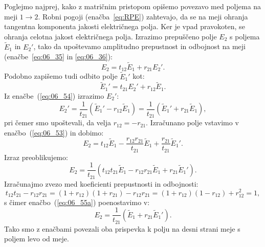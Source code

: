 Poglejmo najprej, kako z matričnim pristopom opišemo povezavo med poljema na 
meji $1\rightarrow 2$. Robni pogoji (enačba~\ref{eq:RPE}) zahtevajo, 
da se na meji ohranja tangentna komponenta jakosti električnega polja. Ker je
vpad pravokoten, se ohranja celotna jakost električnega polja. Izrazimo 
prepuščeno polje $E_2$ s poljema $\tilde{E}_1$ in $E_2'$, tako da upoštevamo
amplitudno prepustnost in odbojnost na meji (enačbe~\ref{eq:06_35} in \ref{eq:06_36}):
\begin{equation}
E_2 = t_{12}\tilde{E}_1 + r_{21}E_2'.
\label{eq:06_53}
\end{equation}
Podobno zapišemo tudi odbito polje $\tilde{E}_1'$ kot:
\begin{equation}
\tilde{E}_1' = t_{21}E_2' + r_{12}\tilde{E}_1.
\label{eq:06_54}
\end{equation}
Iz enačbe~(\ref{eq:06_54}) izrazimo $E_2'$:
\begin{equation}
E_2' = \frac{1}{t_{21}}\left(\tilde{E}_1' - r_{12}\tilde{E}_1\right) = 
\frac{1}{t_{21}}\left(\tilde{E}_1' + r_{21}\tilde{E}_1\right),
\label{eq:06_54a}
\end{equation}
pri čemer smo upoštevali, da velja $r_{12} = - r_{21}$. Izračunano polje vstavimo v 
enačbo~(\ref{eq:06_53}) in dobimo:
\begin{equation}
E_2 = t_{12}\tilde{E}_1 -\frac{r_{12}r_{21}}{t_{21}}\tilde{E}_1 + 
\frac{r_{21}}{t_{21}}\tilde{E}_1'.
\label{eq:06_55}
\end{equation}
Izraz preoblikujemo:
\begin{equation}
E_2 = \frac{1}{t_{21}} \left(t_{12}t_{21}\tilde{E}_1 -r_{12}r_{21}\tilde{E}_1 + 
r_{21}\tilde{E}_1'\right)\!\!.
\label{eq:06_55a}
\end{equation}
Izračunajmo zvezo med koeficienti prepustnosti in odbojnosti:
\begin{equation}
t_{12}t_{21} - r_{12}r_{21} = (1+r_{12})(1+r_{21}) - r_{12}r_{21} = 
(1+r_{12})(1-r_{12}) + r_{12}^2 = 1,
\label{eq:06_56}
\end{equation}
s čimer enačbo~(\ref{eq:06_55a}) poenostavimo v:
\begin{equation}
E_2 = \frac{1}{t_{21}}\left(\tilde{E}_1 + r_{21}\tilde{E}_1'\right).
\label{eq:06_57}
\end{equation}
Tako smo z enačbami povezali oba prispevka k polju na desni strani meje s poljem
levo od meje.  

